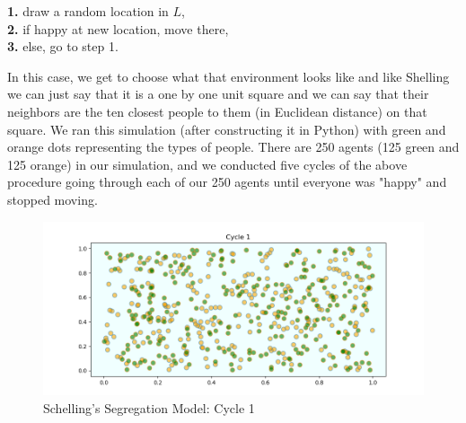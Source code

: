 \documentclass[12pt,twoside]{reedthesis}
\begin{document}
\begin{adjustwidth}{1cm}{}
	\textbf{1.} draw a random location in $L$, \\
	\textbf{2.} if happy at new location, move there,\\
	\textbf{3.} else, go to step 1.
\end{adjustwidth}

In this case, we get to choose what that environment looks like and like Shelling we can just say that it is a one by one unit square and we can say that their neighbors are the ten closest people to them (in Euclidean distance) on that square. We ran this simulation (after constructing it in Python) with green and orange dots representing the types of people. There are 250 agents (125 green and 125 orange) in our simulation, and we conducted five cycles of the above procedure going through each of our 250 agents until everyone was "happy" and stopped moving.

\begin{figure}[h!]
	\centering
	\includegraphics[scale=0.5]{Figures/segregation_1}
	\caption{Schelling's Segregation Model: Cycle 1}
	\label{SSM1_ch1}
\end{figure}
\end{document}
